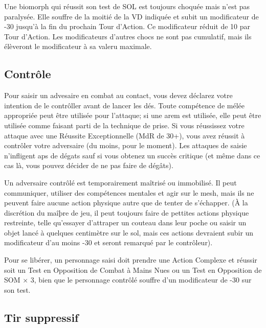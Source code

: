 Une biomorph qui réussit son test de SOL est toujours choquée mais n'est pas paralysée. Elle souffre de la moitié de la VD indiquée et subit un modificateur de -30 jusqu'à la fin du prochain Tour d'Action. Ce modificateur réduit de 10 par Tour d'Action. Les modificateurs d'autres chocs ne sont pas cumulatif, mais ils élèveront le modificateur à sa valeru maximale. 

\subsection{Contrôle} \label{sec:subdual} 

Pour saisir un advesaire en combat au contact, vous devez déclarez votre intention de le contrôller avant de lancer les dés. Toute compétence de mélée appropriée peut être utilisée pour l'attaque; si une arem est utilisée, elle peut être utilisée comme faisant parti de la technique de prise. Si vous réussissez votre attaque avec une Réussite Exceptionnelle (MdR de 30+), vous avez réussit à contrôler votre adversaire (du moins, pour le moment). Les attaques de saisie n'infligent aps de dégats sauf si vous obtenez un succès critique (et même dans ce cas là, vous pouvez décider de ne pas faire de dégâts). 

Un adversaire contrôlé est temporairement maîtrisé ou immobilisé. Il peut communiquer, utiliser des compétences mentales et agir sur le mesh, mais ils ne peuvent faire aucune action physique autre que de tenter de s'échapper. (À la discrétion du maîþre de jeu, il peut toujours faire de pettites actions physique restreinte, telle qu'essayer d'attraper un couteau dans leur poche ou saisir un objet lancé à quelques centimètre sur le sol, mais ces actions devraient subir un modificateur d'au moins -30 et seront remarqué par le contrôleur). 

Pour se libérer, un personnage saisi doit prendre une Action Complexe et réussir soit un Test en Opposition de Combat à Mains Nues ou un Test en Opposition de SOM $\times$ 3, bien que le personnage contrôlé souffre d'un modificateur de -30 sur son test. 

\subsection{Tir suppressif} \label{sec:suppressive-fire} 

